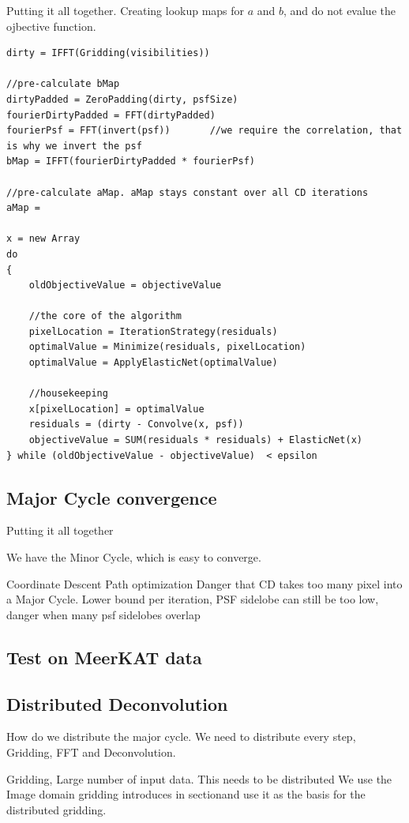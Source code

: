 Putting it all together. Creating lookup maps for $a$ and $b$, and do not evalue the ojbective function.
\begin{lstlisting}
dirty = IFFT(Gridding(visibilities))

//pre-calculate bMap
dirtyPadded = ZeroPadding(dirty, psfSize)
fourierDirtyPadded = FFT(dirtyPadded)
fourierPsf = FFT(invert(psf))		//we require the correlation, that is why we invert the psf
bMap = IFFT(fourierDirtyPadded * fourierPsf)

//pre-calculate aMap. aMap stays constant over all CD iterations
aMap = 
 
x = new Array   
do 
{
	oldObjectiveValue = objectiveValue
	
	//the core of the algorithm
	pixelLocation = IterationStrategy(residuals)
	optimalValue = Minimize(residuals, pixelLocation)
	optimalValue = ApplyElasticNet(optimalValue)
	
	//housekeeping
	x[pixelLocation] = optimalValue
	residuals = (dirty - Convolve(x, psf))
	objectiveValue = SUM(residuals * residuals) + ElasticNet(x)
} while (oldObjectiveValue - objectiveValue)  < epsilon
\end{lstlisting}





\subsection{Major Cycle convergence}
Putting it all together

We have the Minor Cycle, which is easy to converge.

Coordinate Descent Path optimization \cite{friedman2010regularization}
Danger that CD takes too many pixel into a Major Cycle. Lower bound per iteration, PSF sidelobe
  can still be too low, danger when many psf sidelobes overlap

\subsection{Test on MeerKAT data}

\subsection{Distributed Deconvolution}
How do we distribute the major cycle. We need to distribute every step, Gridding, FFT and Deconvolution.

Gridding, Large number of input data. This needs to be distributed
We use the Image domain gridding introduces in sectionand use it as the basis for the distributed gridding.


